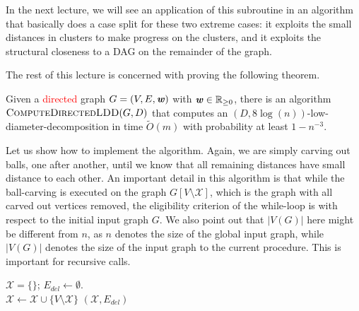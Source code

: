 In the next lecture, we will see an application of this subroutine in an algorithm that basically does a case split for these two extreme cases: it exploits the small distances in clusters to make progress on the clusters, and it exploits the structural closeness to a DAG on the remainder of the graph.

The rest of this lecture is concerned with proving the following theorem.

\begin{theorem}\label{thm:computeDirLDDguarantees}
Given a \textcolor{red}{directed} graph $G = (V,E,\boldsymbol{\mathit{w}})$ with $\boldsymbol{\mathit{w}} \in \mathbb{R}_{\geq 0}$, there is an algorithm $\textsc{ComputeDirectedLDD}(G, D)$ that computes an $(D, 8 \log(n))$-low-diameter-decomposition in time $\tilde{O}(m)$ with probability at least $1-n^{-3}$. 
\end{theorem}

Let us show how to implement the algorithm. Again, we are simply carving out balls, one after another, until we know that all remaining distances have small distance to each other. An important detail in this algorithm is that while the ball-carving is executed on the graph $G[V \setminus \mathcal{X}]$, which is the graph with all carved out vertices removed, the eligibility criterion of the while-loop is with respect to the initial input graph $G$. We also point out that $|V(G)|$ here might be different from $n$, as $n$ denotes the size of the global input graph, while $|V(G)|$ denotes the size of the input graph to the current procedure. This is important for recursive calls.

\begin{algorithm}
$\mathcal{X} = \{\}$;  $E_{del} \gets \emptyset$.\\
$\mathcal{X} \gets \mathcal{X} \cup \{ V \setminus \mathcal{X}\}$\label{lne:addCluster} 
\Return $(\mathcal{X}, E_{del})$
\caption{$\textsc{ComputeDirectedLDD}(G, D)$}
\label{alg:directedLDD}
\end{algorithm}


